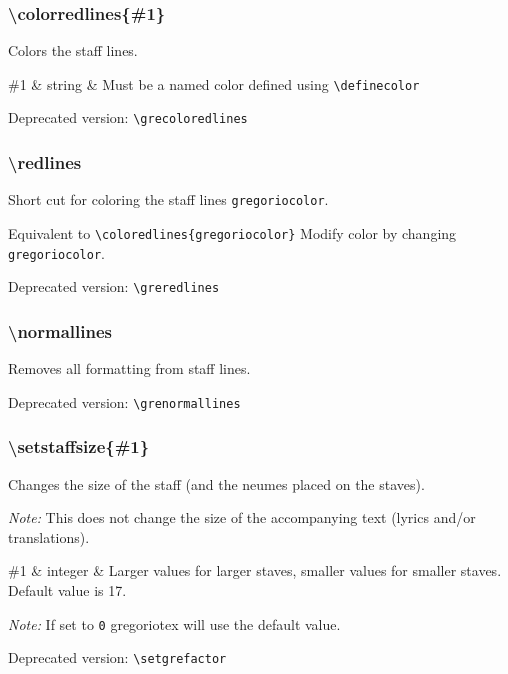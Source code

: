 \subsubsection*{\textbackslash colorredlines\{\#1\}}
Colors the staff lines.

\begin{argtable}
  \#1 & string & Must be a named color defined using \verb=\definecolor= \\
\end{argtable}

\smallskip\hskip 15pt Deprecated version: \verb=\grecoloredlines=

\subsubsection*{\textbackslash redlines}
Short cut for coloring the staff lines \verb=gregoriocolor=.

Equivalent to \verb=\coloredlines{gregoriocolor}= Modify color by
changing \verb=gregoriocolor=.

\smallskip\hskip 15pt Deprecated version: \verb=\greredlines=

\subsubsection*{\textbackslash normallines}
Removes all formatting from staff lines.

\smallskip\hskip 15pt Deprecated version: \verb=\grenormallines=

\subsubsection*{\textbackslash setstaffsize\{\#1\}}
Changes the size of the staff (and the neumes placed on the staves).

\emph{Note:} This does not change the size of the accompanying text
(lyrics and/or translations).

\begin{argtable}
  \#1 & integer & Larger values for larger staves, smaller values for
  smaller staves. Default value is 17. \\
\end{argtable}

\emph{Note:} If set to \verb=0= gregoriotex will use the default value.

\smallskip\hskip 15pt Deprecated version: \verb=\setgrefactor=

